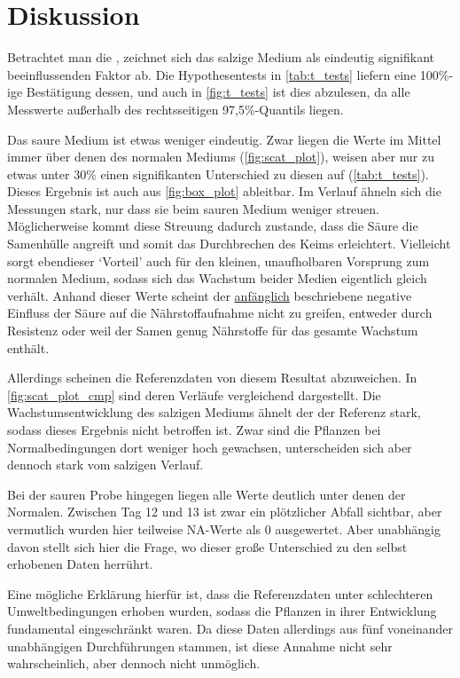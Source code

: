 \section{Diskussion} %
    \label{sec:diskussion}
    Betrachtet man die , zeichnet sich das salzige Medium als eindeutig signifikant beeinflussenden Faktor ab. Die Hypothesentests in \autoref{tab:t_tests} liefern eine 100\%-ige Bestätigung dessen, und auch in \autoref{fig:t_tests} ist dies abzulesen, da alle Messwerte außerhalb des rechtsseitigen 97,5\%-Quantils liegen.

    Das saure Medium ist etwas weniger eindeutig. Zwar liegen die Werte im Mittel immer über denen des normalen Mediums (\autoref{fig:scat_plot}), weisen aber nur zu etwas unter 30\% einen signifikanten Unterschied zu diesen auf (\autoref{tab:t_tests}). Dieses Ergebnis ist auch aus \autoref{fig:box_plot} ableitbar. Im Verlauf ähneln sich die Messungen stark, nur dass sie beim sauren Medium weniger streuen. Möglicherweise kommt diese Streuung dadurch zustande, dass die Säure die Samenhülle angreift und somit das Durchbrechen des Keims erleichtert. Vielleicht sorgt ebendieser `Vorteil' auch für den kleinen, unaufholbaren Vorsprung zum normalen Medium, sodass sich das Wachstum beider Medien eigentlich gleich verhält. Anhand dieser Werte scheint der \hyperref[sec:einleitung]{anfänglich} beschriebene negative Einfluss der Säure auf die Nährstoffaufnahme nicht zu greifen, entweder durch Resistenz oder weil der Samen genug Nährstoffe für das gesamte Wachstum enthält.

    Allerdings scheinen die Referenzdaten von diesem Resultat abzuweichen. In \autoref{fig:scat_plot_cmp} sind deren Verläufe vergleichend dargestellt. Die Wachstumsentwicklung des salzigen Mediums ähnelt der der Referenz stark, sodass dieses Ergebnis nicht betroffen ist. Zwar sind die Pflanzen bei Normalbedingungen dort weniger hoch gewachsen, unterscheiden sich aber dennoch stark vom salzigen Verlauf.

    Bei der sauren Probe hingegen liegen alle Werte deutlich unter denen der Normalen. Zwischen Tag 12 und 13 ist zwar ein plötzlicher Abfall sichtbar, aber vermutlich wurden hier teilweise NA-Werte als 0 ausgewertet. Aber unabhängig davon stellt sich hier die Frage, wo dieser große Unterschied zu den selbst erhobenen Daten herrührt.

    Eine mögliche Erklärung hierfür ist, dass die Referenzdaten unter schlechteren Umweltbedingungen erhoben wurden, sodass die Pflanzen in ihrer Entwicklung fundamental eingeschränkt waren. Da diese Daten allerdings aus fünf voneinander unabhängigen Durchführungen stammen, ist diese Annahme nicht sehr wahrscheinlich, aber dennoch nicht unmöglich.

